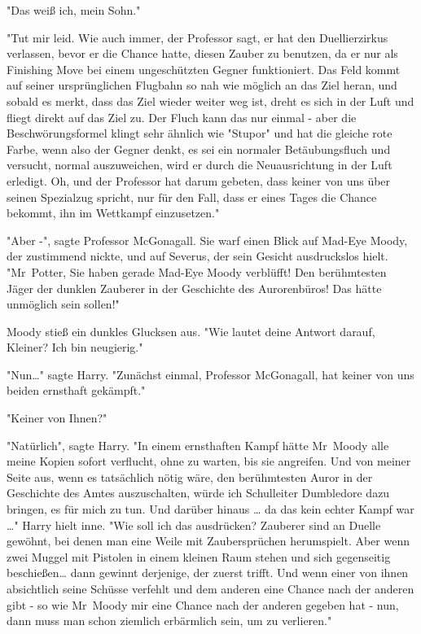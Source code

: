 {"Das weiß ich, mein Sohn."

"Tut mir leid. Wie auch immer, der Professor sagt, er hat den Duellierzirkus verlassen, bevor er die Chance hatte, diesen Zauber zu benutzen, da er nur als Finishing Move bei einem ungeschützten Gegner funktioniert. Das Feld kommt auf seiner ursprünglichen Flugbahn so nah wie möglich an das Ziel heran, und sobald es merkt, dass das Ziel wieder weiter weg ist, dreht es sich in der Luft und fliegt direkt auf das Ziel zu. Der Fluch kann das nur einmal - aber die Beschwörungsformel klingt sehr ähnlich wie "Stupor" und hat die gleiche rote Farbe, wenn also der Gegner denkt, es sei ein normaler Betäubungsfluch und versucht, normal auszuweichen, wird er durch die Neuausrichtung in der Luft erledigt. Oh, und der Professor hat darum gebeten, dass keiner von uns über seinen Spezialzug spricht, nur für den Fall, dass er eines Tages die Chance bekommt, ihn im Wettkampf einzusetzen."

"Aber -", sagte Professor McGonagall. Sie warf einen Blick auf Mad-Eye Moody, der zustimmend nickte, und auf Severus, der sein Gesicht ausdruckslos hielt. "Mr~Potter, Sie haben gerade Mad-Eye Moody verblüfft! Den berühmtesten Jäger der dunklen Zauberer in der Geschichte des Aurorenbüros! Das hätte unmöglich sein sollen!"

Moody stieß ein dunkles Glucksen aus. "Wie lautet deine Antwort darauf, Kleiner? Ich bin neugierig."

"Nun…" sagte Harry. "Zunächst einmal, Professor McGonagall, hat keiner von uns beiden ernsthaft gekämpft."

"Keiner von Ihnen?"

"Natürlich", sagte Harry. "In einem ernsthaften Kampf hätte Mr~Moody alle meine Kopien sofort verflucht, ohne zu warten, bis sie angreifen. Und von meiner Seite aus, wenn es tatsächlich nötig wäre, den berühmtesten Auror in der Geschichte des Amtes auszuschalten, würde ich Schulleiter Dumbledore dazu bringen, es für mich zu tun. Und darüber hinaus … da das kein echter Kampf war …" Harry hielt inne. "Wie soll ich das ausdrücken? Zauberer sind an Duelle gewöhnt, bei denen man eine Weile mit Zaubersprüchen herumspielt. Aber wenn zwei Muggel mit Pistolen in einem kleinen Raum stehen und sich gegenseitig beschießen… dann gewinnt derjenige, der zuerst trifft. Und wenn einer von ihnen absichtlich seine Schüsse verfehlt und dem anderen eine Chance nach der anderen gibt - so wie Mr~Moody mir eine Chance nach der anderen gegeben hat - nun, dann muss man schon ziemlich erbärmlich sein, um zu verlieren."

}
